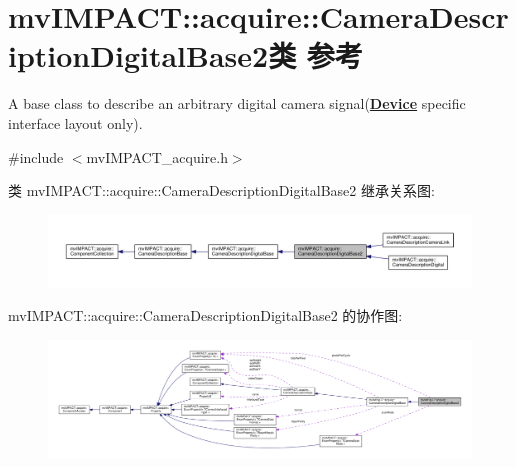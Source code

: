 \hypertarget{classmv_i_m_p_a_c_t_1_1acquire_1_1_camera_description_digital_base2}{\section{mv\+I\+M\+P\+A\+C\+T\+:\+:acquire\+:\+:Camera\+Description\+Digital\+Base2类 参考}
\label{classmv_i_m_p_a_c_t_1_1acquire_1_1_camera_description_digital_base2}
}


A base class to describe an arbitrary digital camera signal({\bfseries \hyperlink{classmv_i_m_p_a_c_t_1_1acquire_1_1_device}{Device}} specific interface layout only).  




{\ttfamily \#include $<$mv\+I\+M\+P\+A\+C\+T\+\_\+acquire.\+h$>$}



类 mv\+I\+M\+P\+A\+C\+T\+:\+:acquire\+:\+:Camera\+Description\+Digital\+Base2 继承关系图\+:
\nopagebreak
\begin{figure}[H]
\begin{center}
\leavevmode
\includegraphics[width=350pt]{classmv_i_m_p_a_c_t_1_1acquire_1_1_camera_description_digital_base2__inherit__graph}
\end{center}
\end{figure}


mv\+I\+M\+P\+A\+C\+T\+:\+:acquire\+:\+:Camera\+Description\+Digital\+Base2 的协作图\+:
\nopagebreak
\begin{figure}[H]
\begin{center}
\leavevmode
\includegraphics[width=350pt]{classmv_i_m_p_a_c_t_1_1acquire_1_1_camera_description_digital_base2__coll__graph}
\end{center}
\end{figure}
